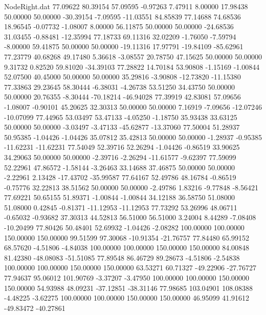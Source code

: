 \begin{filecontents}{NodeRight.dat}
  77.09622   80.39154   57.09595    -0.97263    7.47911    8.00000   17.98438   50.00000   50.00000  -30.39154   -7.09595  -11.03551   84.85839
  77.14688   74.68536   18.96545    -0.07732   -1.08007    8.00000   56.11875   50.00000   50.00000  -24.68536   31.03455   -0.88481  -12.35994
  77.18733   69.11316   32.02209    -1.76050   -7.59794   -8.00000   59.41875   50.00000   50.00000  -19.11316   17.97791  -19.84109  -85.62961
  77.23779   40.68268   49.17480     5.36618   -3.08557   20.78750   47.15625   50.00000   50.00000    9.31732    0.82520   59.81020  -34.39103
  77.28822   14.70184   53.90808    -1.15169   -1.00844   52.07500   40.45000   50.00000   50.00000   35.29816   -3.90808  -12.73820  -11.15380
  77.33863   29.23645   58.30444    -6.38031   -4.26738   53.51250   34.43750   50.00000   50.00000   20.76355   -8.30444  -70.18214  -46.94028
  77.39919   42.83081   57.09656    -1.08007   -0.90101   45.20625   32.30313   50.00000   50.00000    7.16919   -7.09656  -12.07246  -10.07099
  77.44965   53.03497   53.47133    -4.05250   -1.18750   35.93438   33.63125   50.00000   50.00000   -3.03497   -3.47133  -45.62877  -13.37060
  77.50004   51.28937   50.95385    -1.04426   -1.04426   35.07812   35.42813   50.00000   50.00000   -1.28937   -0.95385  -11.62231  -11.62231
  77.54049   52.39716   52.26294    -1.04426   -0.86519   33.90625   34.29063   50.00000   50.00000   -2.39716   -2.26294  -11.61577   -9.62397
  77.59099   52.22961   47.86572    -1.58144   -3.26463   33.14688   37.46875   50.00000   50.00000   -2.22961    2.13428  -17.43702  -35.99587
  77.64167   52.49786   48.16784    -0.86519   -0.75776   32.22813   38.51562   50.00000   50.00000   -2.49786    1.83216   -9.77848   -8.56421
  77.69221   50.65155   51.89371    -1.00844   -1.00844   34.12188   36.58750   51.08000   51.08000    0.42845   -0.81371  -11.12953  -11.12953
  77.73292   53.26996   48.06711    -0.65032   -0.93682   37.30313   44.52813   56.51000   56.51000    3.24004    8.44289   -7.08408  -10.20499
  77.80426   50.48401   52.69932    -1.04426   -2.08282  100.00000  100.00000  150.00000  150.00000   99.51599   97.30068  -10.91354  -21.76757
  77.84480   65.99152   68.57620    -4.51806   -4.84038  100.00000  100.00000  150.00000  150.00000   84.00848   81.42380  -48.08083  -51.51085
  77.89548   86.46729   89.28673    -4.51806   -2.54838  100.00000  100.00000  150.00000  150.00000   63.53271   60.71327  -49.22906  -27.76727
  77.94637   95.06012  101.90769    -3.37207   -3.47950  100.00000  100.00000  150.00000  150.00000   54.93988   48.09231  -37.12851  -38.31146
  77.98685  103.04901  108.08388    -4.48225   -3.62275  100.00000  100.00000  150.00000  150.00000   46.95099   41.91612  -49.83472  -40.27861

\end{filecontents}

